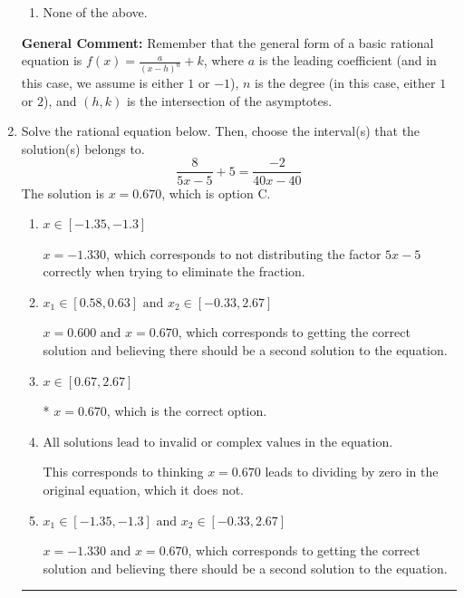 \documentclass{extbook}[14pt]
\newcommand{\litem}[1]{\item #1

\rule{\textwidth}{0.4pt}}
\begin{document}
\begin{enumerate}
{\begin{enumerate}[label=\Alph*.]
\begin{multicols}{2}
\end{multicols}\item None of the above.\end{enumerate}
\textbf{General Comment:} Remember that the general form of a basic rational equation is $ f(x) = \frac{a}{(x-h)^n} + k$, where $a$ is the leading coefficient (and in this case, we assume is either $1$ or $-1$), $n$ is the degree (in this case, either $1$ or $2$), and $(h, k)$ is the intersection of the asymptotes.
}
\litem{
Solve the rational equation below. Then, choose the interval(s) that the solution(s) belongs to.
\[ \frac{8}{5x -5} + 5 = \frac{-2}{40x -40} \]The solution is \( x = 0.670 \), which is option C.\begin{enumerate}[label=\Alph*.]
\item \( x \in [-1.35,-1.3] \)

$x = -1.330$, which corresponds to not distributing the factor $5x -5$ correctly when trying to eliminate the fraction.
\item \( x_1 \in [0.58, 0.63] \text{ and } x_2 \in [-0.33,2.67] \)

$x = 0.600 \text{ and } x = 0.670$, which corresponds to getting the correct solution and believing there should be a second solution to the equation.
\item \( x \in [0.67,2.67] \)

* $x = 0.670$, which is the correct option.
\item \( \text{All solutions lead to invalid or complex values in the equation.} \)

This corresponds to thinking $x = 0.670$ leads to dividing by zero in the original equation, which it does not.
\item \( x_1 \in [-1.35, -1.3] \text{ and } x_2 \in [-0.33,2.67] \)

$x = -1.330 \text{ and } x = 0.670$, which corresponds to getting the correct solution and believing there should be a second solution to the equation.
\end{enumerate}

}
\end{enumerate}
\end{document}

